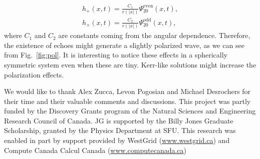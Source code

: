 \documentclass[article,aps,nofootinbib,twocolumn,superscriptaddress]{revtex4-1}
\begin{document}
\begin{eqnarray}
h_+(x,t)=\frac{C_1}{r(|x|)}\Psi^{\mathrm{even}}_{20}(x,t),\nonumber\\
h_{\times}(x,t)=\frac{C_2}{r(|x|)}\Psi^{\mathrm{odd}}_{20}(x,t),\label{eq:pols}
\end{eqnarray}
where $C_1$ and $C_2$ are constants coming from the angular dependence. Therefore, the existence of echoes might generate a slightly polarized wave, as we can see from Fig.~\ref{fig:pol}. It is interesting to notice these effects in a spherically symmetric system even when these are tiny. Kerr-like solutions might increase the polarization effects.
    
\begin{acknowledgments}
We would like to thank Alex Zucca, Levon Pogosian and Michael Desrochers for their time and their valuable comments and discussions. This project was partly funded by the Discovery Grants program of the Natural Sciences and Engineering Research Council of Canada. JG is supported by the Billy Jones Graduate Scholarship, granted by the Physics Department at SFU. This research was enabled in part by support provided by WestGrid (\url{www.westgrid.ca}) and Compute Canada Calcul Canada (\url{www.computecanada.ca})
\end{acknowledgments}

\end{document}
